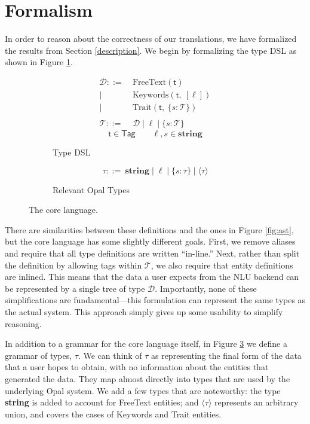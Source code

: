 \documentclass[twocolumn]{article}
\newcommand{\fcy}[1]{\mathcal{#1}}
\newcommand{\etag}[1]{\textsf{#1}}
\newcommand{\ff}[1]{\textsf{#1}}
\begin{document}
\section{Formalism} \label{formalism}
In order to reason about the correctness of our translations, we have formalized
the results from Section \ref{description}. We begin by formalizing the type DSL
as shown in Figure \ref{fig:grammar_a}.
\begin{figure}
  \centering
  \begin{subfigure}{1\linewidth}
    \begin{align*}
      \fcy{D} ::=&\ \text{FreeText}(\etag{t}) \\
      |&\ \text{Keywords}(\etag{t},\ [\ell]) \\
      |&\ \text{Trait}(\etag{t},\ \{s: \fcy{T}\}) \\
      \\
      \fcy{T} ::=&\ \fcy{D} \mid \ell \mid \{s: \fcy{T}\}
    \end{align*}
    $$ \etag{t} \in \ff{Tag} \qquad \ell, s \in \textbf{string} $$
    \caption{Type DSL}
    \label{fig:grammar_a}
  \end{subfigure}\vspace{1cm}
  \begin{subfigure}{1\linewidth}
    $$ \tau ::=\ \textbf{string} \mid \ell \mid \{s: \tau\} \mid \langle \tau
    \rangle $$
    \caption{Relevant Opal Types}
    \label{fig:grammar_b}
  \end{subfigure}
  \caption{The core language.}
\end{figure}
There are similarities between these definitions and the ones in Figure
\ref{fig:ast}, but the core language has some slightly different goals. First,
we remove aliases and require that all type definitions are written ``in-line.''
Next, rather than split the definition by allowing tags within $\fcy{T}$, we
also require that entity definitions are inlined. This means that the data a
user expects from the NLU backend can be represented by a single tree of type
$\fcy{D}$. Importantly, none of these simplifications are fundamental---this
formulation can represent the same types as the actual system. This approach
simply gives up some usability to simplify reasoning.

In addition to a grammar for the core language itself, in Figure
\ref{fig:grammar_b} we define a grammar of types, $\tau$. We can think of $\tau$
as representing the final form of the data that a user hopes to obtain, with no
information about the entities that generated the data. They map almost directly
into types that are used by the underlying Opal system. We add a few types that
are noteworthy: the type {\bf string} is added to account for FreeText entities;
and $\langle {\tau} \rangle$ represents an arbitrary union, and covers the cases
of Keywords and Trait entities.
\end{document}
